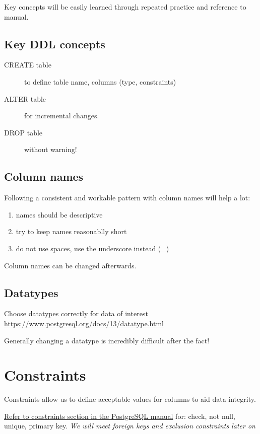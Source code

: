 Key concepts will be easily learned through repeated practice and
reference to manual.

\subsection{Key DDL concepts}

\begin{description}
\item[CREATE table]
  to define table name, columns (type, constraints)
\item[ALTER table]
  for incremental changes.
\item[DROP table]
  without warning!
\end{description}


\subsection{Column names}

Following a consistent and workable pattern with column names will help a lot:
\begin{enumerate}
\item names should be descriptive
\item try to keep names reasonablly short
\item do not use spaces, use the underscore instead (\_)
\end{enumerate}
Column names can be changed afterwards.

\subsection{Datatypes} 

Choose datatypes correctly for data of interest\\
\url{https://www.postgresql.org/docs/13/datatype.html}

Generally changing a datatype is incredibly difficult after the fact!


\section{Constraints}
\label{sec:constraints}

Constraints allow us to define acceptable values for columns to aid data
integrity.

\href{https://www.postgresql.org/docs/14/ddl-constraints.html}{Refer to
constraints section in the PostgreSQL manual} for: check, not null,
unique, primary key. \emph{We will meet foreign keys and exclusion
constraints later on}

